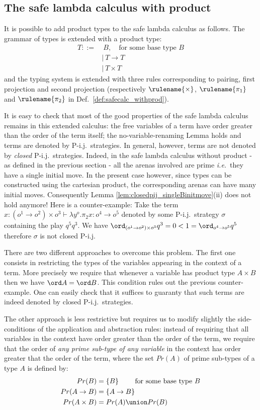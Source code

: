 \subsection{The safe lambda calculus with product}
It is possible to add product types to the safe lambda calculus as
follows. The grammar of types is extended with a product type:
\begin{align*}
T ::=& \ B,  \quad \mbox{for some base type $B$} \\
   &| \ T \rightarrow T \\
   &| \ T \times T
\end{align*}
and the typing system is extended with three rules corresponding to
pairing, first projection and second projection (respectively
$\rulename{\times}$, $\rulename{\pi_1}$ and $\rulename{\pi_2}$ in
Def.\ \ref{def:safecalc_withprod}).

It is easy to check that most of the good properties of the safe
lambda calculus remains in this extended calculus: the free
variables of a term have order greater than the order of the term
itself; the no-variable-renaming Lemma holds and terms are denoted
by P-i.j.\ strategies. In general, however, terms are not denoted by
\emph{closed} P-i.j.\ strategies. Indeed, in the safe lambda
calculus without product - as defined in the previous section - all
the arenas involved are prime {\it i.e.}~they have a single initial
move. In the present case however, since types can be constructed
using the cartesian product, the corresponding arenas can have many
initial moves. Consequently Lemma
\ref{lem:closedpij_singleBinitmove}(ii) does not hold anymore! Here
is a counter-example: Take the term $x : (o^1\rightarrow o^2)\times
o^3 \vdash \lambda y^o . \pi_2 x : o^4 \rightarrow o^5$ denoted by
some P-i.j.\ strategy $\sigma$ containing the play $q^5 q^3$. We
have $\ord_{(o^1\rightarrow o^2)\times o^3} q^3 = 0 < 1 = \ord_{o^4
\rightarrow o^5} q^5$ therefore $\sigma$ is not closed P-i.j.


There are two different approaches to overcome this problem. The
first one consists in restricting the types of the variables
appearing in the context of a term. More precisely we require that
whenever a variable has product type $A \times B$ then we have $\ord
A = \ord B$. This condition rules out the previous counter-example.
One can easily check that it suffices to guaranty that such terms
are indeed denoted by closed P-i.j.\ strategies.

The other approach is less restrictive but requires us to modify
slightly the side-conditions of the application and abstraction
rules: instead of requiring that all variables in the context have
order greater than the order of the term, we require that the order
of \emph{any prime sub-type of any variable} in the context has
order greater that the order of the term, where the set $Pr(A)$ of
prime sub-types of a type $A$ is defined by:
\begin{align*}
Pr(B) &= \{ B \} \qquad \mbox{ for some base type } B \\
Pr(A\rightarrow B) &= \{ A\rightarrow B \} \\
Pr(A\times B) &= Pr(A) \union Pr(B)
\end{align*}

